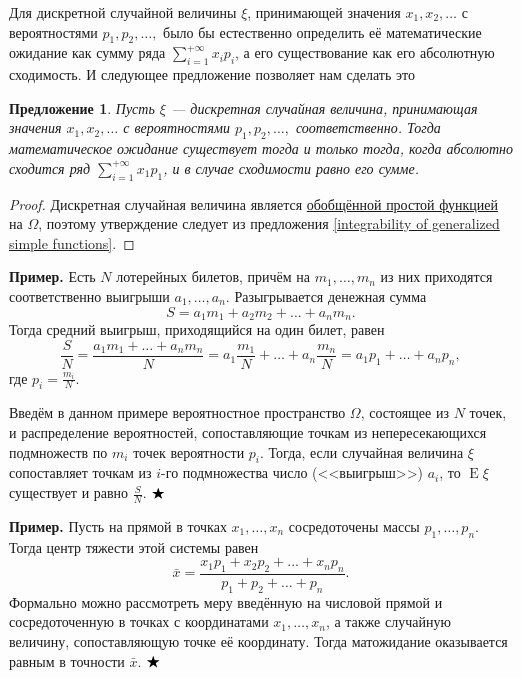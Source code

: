 \documentclass[12pt]{article}
\newtheorem{proposition}[theorem]{Предложение}
\numberwithin{theorem}{section}
\theoremstyle{definition}
\newenvironment{example}{\indent \textbf{Пример.}}{$ \hfill \bigstar $}
\newcommand{\expect}{\operatorname{E}}
\begin{document}
	Для дискретной случайной величины $ \xi $, принимающей значения $ x_1, x_2, \ldots $ с вероятностями $ p_1, p_2, \ldots, $ 
	было бы естественно определить её математические ожидание как сумму ряда
	$ \sum\limits_{i = 1}^{+\infty} x_ip_i $,
	а его существование как его абсолютную сходимость.
	И следующее предложение позволяет нам сделать это
	
	\begin{proposition}
		Пусть $ \xi $ --- дискретная случайная величина, принимающая 
		значения $ x_1, x_2, \ldots $ с вероятностями $ p_1, p_2, \ldots, $ соответственно.
		Тогда математическое ожидание существует тогда и только тогда,
		когда абсолютно сходится ряд $ \sum\limits_{i = 1}^{+\infty} x_1p_1 $,
		и в случае сходимости равно его сумме.
	\end{proposition}
	
	\begin{proof}
		Дискретная случайная величина является \hyperlink{generalized-simple-function}{обобщённой простой функцией} на $ \Omega $,
		поэтому утверждение следует из предложения \ref{integrability of generalized simple functions}.
	\end{proof}
	
	\begin{example}
		Есть $N$ лотерейных билетов, причём на $m_1, \ldots, m_n$ из них приходятся соответственно выигрыши $a_1, \ldots, a_n$.  
		Разыгрывается денежная сумма 
		$$ S = a_1 m_1 + a_2 m_2 + \ldots + a_n m_n. $$
		Тогда средний выигрыш, приходящийся на один билет, равен
		$$ \frac{S}{N} = \frac{a_1 m_1 + \ldots + a_n m_n}{N} = a_1 \frac{m_1}{N} + \ldots + a_n \frac{m_n}{N} = a_1 p_1 + \ldots + a_n p_n, $$
		где $p_i = \frac{m_i}{N}$.
		
		Введём в данном примере вероятностное пространство $ \Omega $, состоящее из $ N $ точек,
		и распределение вероятностей, сопоставляющие точкам из непересекающихся подмножеств по $ m_i $ точек
		вероятности $ p_i $. Тогда, если случайная величина $ \xi $ сопоставляет точкам из $ i $-го подмножества
		число (<<выигрыш>>) $ a_i $, то $ \expect\xi $ существует и равно $ \tfrac{S}{N} $.
	\end{example}
	
	\begin{example}
		Пусть на прямой в точках $x_1, \ldots, x_n$ сосредоточены массы $p_1, \ldots, p_n$.  
		Тогда центр тяжести этой системы равен
		$$ \bar{x} = \frac{x_1 p_1 + x_2 p_2 + \ldots + x_n p_n}{p_1 + p_2 + \ldots + p_n}. $$
		Формально можно рассмотреть меру введённую на числовой прямой и сосредоточенную
		в точках с координатами $ x_1, \ldots, x_n $, а также случайную величину, сопоставляющую точке её координату.
		Тогда матожидание оказывается равным в точности $ \bar{x} $.
	\end{example}
	
\end{document}
